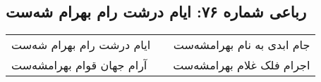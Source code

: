 \begin{center}
\section*{رباعی شماره ۷۶: ایام درشت رام بهرام شه‌ست}
\label{sec:sh076}
\begin{longtable}{l p{0.5cm} r}
ایام درشت رام بهرام شه‌ست
&&
جام ابدی به نام بهرامشه‌ست
\\
آرام جهان قوام بهرامشه‌ست
&&
اجرام فلک غلام بهرامشه‌ست
\\
\end{longtable}
\end{center}
